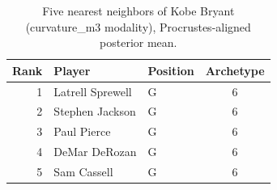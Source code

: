 \begin{table}[htbp]
  \centering\small
  \begin{tabular}{rllc}
    \toprule
    Rank & Player & Position & Archetype \\
    \midrule
    1 & Latrell Sprewell & G & 6 \\
    2 & Stephen Jackson & G & 6 \\
    3 & Paul Pierce & G & 6 \\
    4 & DeMar DeRozan & G & 6 \\
    5 & Sam Cassell & G & 6 \\
    \bottomrule
  \end{tabular}
  \caption{Five nearest neighbors of Kobe Bryant (curvature_m3 modality), Procrustes-aligned posterior mean.}
  \label{tab:Kobe_Bryant_neighbors_curvature_m3}
\end{table}

